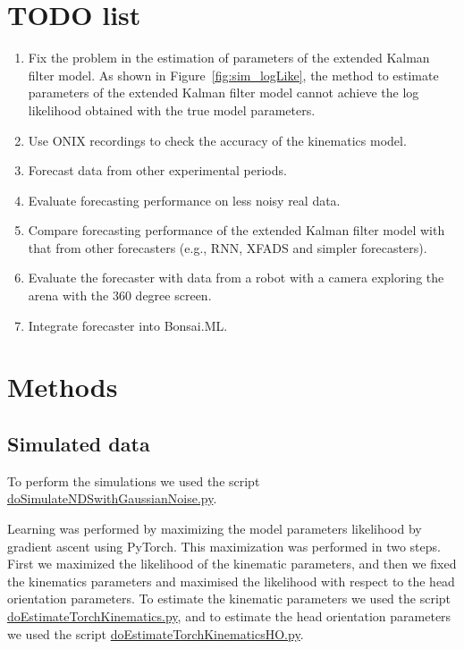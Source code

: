 \documentclass[12pt]{article}
\begin{document}
\section{TODO list}
\label{sec:TODO}

\begin{enumerate}

    \item Fix the problem in the estimation of parameters of the extended
        Kalman filter model. As shown in Figure~\ref{fig:sim_logLike}, the
        method to estimate parameters of the extended Kalman filter model
        cannot achieve the log likelihood obtained with the true model
        parameters.

    \item Use ONIX recordings to check the accuracy of the kinematics model.

    \item Forecast data from other experimental periods.

    \item Evaluate forecasting performance on less noisy real data.

    \item Compare forecasting performance of the extended Kalman filter model
        with that from other forecasters (e.g., RNN, XFADS and simpler
        forecasters).

    \item Evaluate the forecaster with data from a robot with a camera
        exploring the arena with the 360 degree screen.

    \item Integrate forecaster into Bonsai.ML.

\end{enumerate}

\section{Methods}

\subsection{Simulated data}

To perform the simulations we used the script
\href{https://github.com/joacorapela/lds_simulations/blob/master/code/scripts/doSimulateNDSwithGaussianNoise.py}{doSimulateNDSwithGaussianNoise.py}.

Learning was performed by maximizing the model parameters likelihood by
gradient ascent using PyTorch. This maximization was performed in two steps. First we
maximized the likelihood of the kinematic parameters, and then we fixed the
kinematics parameters and maximised the likelihood with respect to the head
orientation parameters. To estimate the kinematic parameters we used the script
\href{https://github.com/joacorapela/lds_simulations/blob/master/code/scripts/doEstimateTorchKinematics.py}{doEstimateTorchKinematics.py},
and to estimate the head orientation parameters we used the script
\href{https://github.com/joacorapela/lds_simulations/blob/master/code/scripts/doEstimateTorchKinematicsHO.py}{doEstimateTorchKinematicsHO.py}.
\end{document}
